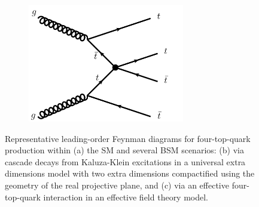 \begin{figure}[t!]
\begin{subfigure}{0.33\textwidth}
  \centering
  \includegraphics[width=0.75\textwidth]{figures/Theory/fig_03b.png}
  \caption{}
  \label{fig:theo:fourtopEFT}
\end{subfigure}


\captionsetup{width=0.85\textwidth} \caption{\small Representative leading-order Feynman diagrams for four-top-quark production within (a) the SM and several BSM scenarios: (b) via cascade decays from Kaluza-Klein excitations in a universal extra dimensions model with two extra dimensions compactified using the geometry of the real projective plane, and (c) via an effective four-top-quark interaction in an effective field theory model.}
\label{fig:theo:fourtop}
\end{figure}